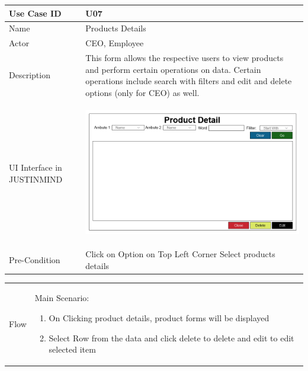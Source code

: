 \documentclass[12pt,a4paper]{report}
\begin{document}
\begin{tabular}{ | m{3cm} | m{12cm}| } \hline

Use Case ID &  U07 \\\hline

Name  	    &  Products Details \\ \hline

Actor     	&  CEO, Employee\\ \hline

Description & This form allows the respective users to view products and perform certain operations on data. Certain operations include search with filters and edit and delete options (only for CEO) as well.  \\ \hline

UI Interface in JUSTINMIND & \begin{center} \includegraphics[scale=0.3]{./UIs for Latex Reports/UI-010 ViewAndDelete Products@1x.png}\end{center}  \\ \hline

Pre-Condition &  Click on Option on Top Left Corner
Select products details
 \\ \hline

\end{tabular} \newpage \begin{tabular}{ | m{3cm} | m{12cm}| }  \hline
Flow & Main Scenario:

\begin{enumerate}
\item   On Clicking product details, product forms will be displayed
\item  Select Row from the data and click delete to delete and edit to edit selected item


\end{enumerate}


\end{tabular}
\end{document}
